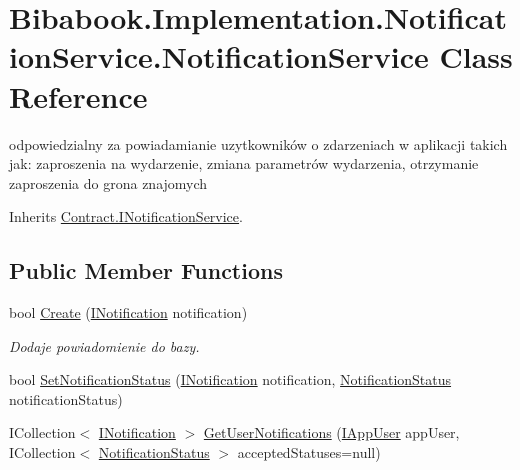 \hypertarget{class_bibabook_1_1_implementation_1_1_notification_service_1_1_notification_service}{}\section{Bibabook.\+Implementation.\+Notification\+Service.\+Notification\+Service Class Reference}
\label{class_bibabook_1_1_implementation_1_1_notification_service_1_1_notification_service}


odpowiedzialny za powiadamianie uzytkowników o zdarzeniach w aplikacji takich jak\+: zaproszenia na wydarzenie, zmiana parametrów wydarzenia, otrzymanie zaproszenia do grona znajomych  




Inherits \hyperlink{interface_contract_1_1_i_notification_service}{Contract.\+I\+Notification\+Service}.

\subsection*{Public Member Functions}
\begin{DoxyCompactItemize}
\item 
bool \hyperlink{class_bibabook_1_1_implementation_1_1_notification_service_1_1_notification_service_aa7b8c602d5a131a45750533b9bcf2fe0}{Create} (\hyperlink{interface_contract_1_1_i_notification}{I\+Notification} notification)
\begin{DoxyCompactList}\small\item\em Dodaje powiadomienie do bazy. \end{DoxyCompactList}\item 
bool \hyperlink{class_bibabook_1_1_implementation_1_1_notification_service_1_1_notification_service_afd21583a36aa8ef0c7c775300200d798}{Set\+Notification\+Status} (\hyperlink{interface_contract_1_1_i_notification}{I\+Notification} notification, \hyperlink{namespace_contract_1_1_enums_acc3ee7ff530d140749aef3196a50ae4c}{Notification\+Status} notification\+Status)
\item 
I\+Collection$<$ \hyperlink{interface_contract_1_1_i_notification}{I\+Notification} $>$ \hyperlink{class_bibabook_1_1_implementation_1_1_notification_service_1_1_notification_service_a90481a88843dca93fb03274cddb461ad}{Get\+User\+Notifications} (\hyperlink{interface_contract_1_1_i_app_user}{I\+App\+User} app\+User, I\+Collection$<$ \hyperlink{namespace_contract_1_1_enums_acc3ee7ff530d140749aef3196a50ae4c}{Notification\+Status} $>$ accepted\+Statuses=null)
\end{DoxyCompactItemize}


